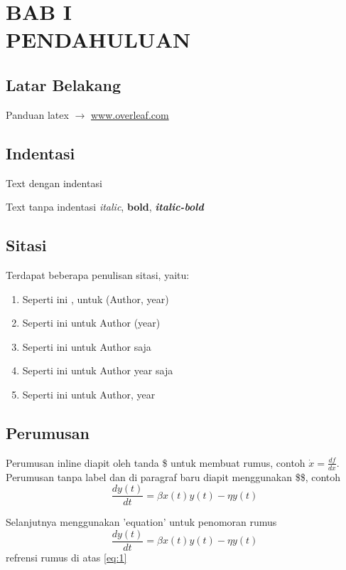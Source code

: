 \chapter*{BAB I\\PENDAHULUAN}
\thispagestyle{chapterfirstpage}

\section{Latar Belakang}
Panduan latex $\rightarrow$ \href{https://www.overleaf.com/learn/latex/Learn_LaTeX_in_30_minutes}{www.overleaf.com}
\section{Indentasi}
Text dengan indentasi \lipsum[1][1-3]

\noindent Text tanpa indentasi \lipsum[1][1-3]
\textit{italic}, \textbf{bold}, \textbf{\textit{italic-bold}}

\section{Sitasi}
\noindent Terdapat beberapa penulisan sitasi, yaitu:
\begin{enumerate}
    \item Seperti ini \cite{Luschi2013}, untuk (Author, year)
    \item Seperti ini  untuk Author (year)
    \item Seperti ini \citeauthor{Luschi2013} untuk Author saja
    \item Seperti ini \citeyear{Luschi2013} untuk Author year saja
    \item Seperti ini  untuk Author, year
\end{enumerate}

\section{Perumusan}
\noindent Perumusan inline diapit oleh tanda \$ untuk membuat rumus, contoh $\dot{x}=\frac{df}{dx}$.
\noindent Perumusan tanpa label dan di paragraf baru diapit menggunakan \$\$, contoh
$$
    \frac{dy(t)}{dt} = \beta x(t)y(t) - \eta y(t)
$$

\noindent Selanjutnya menggunakan 'equation' untuk penomoran rumus
\begin{equation}\label{eq:1}
    \frac{dy(t)}{dt} = \beta x(t)y(t) - \eta y(t)
\end{equation}
\noindent refrensi rumus di atas \eqref{eq:1}

